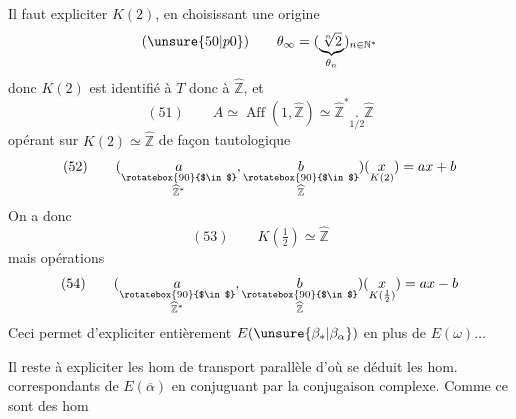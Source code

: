 Il faut expliciter $K(2)$,  en choisissant une origine
\[
(\unsure{50|p0})\qquad\theta_\infty=
(\underbrace{\sqrt[n]{2}}_{\theta_n})_{n\in\mathbb N^*}
\]
donc $K(2)$ est identifié à $T$ donc à $\widehat{\mathbb Z}$, et
\[
(51)\qquad A\simeq\operatorname{Aff}(1,\widehat{\mathbb Z})
\simeq\widehat{\mathbb Z}^{*}\mathbin{\underset{\scriptscriptstyle1/2}{.}}\widehat{\mathbb Z}
\]
opérant sur $K(2)\simeq\widehat{\mathbb Z}$ de façon tautologique
\[
(52)\qquad
(\underset{\substack{\rotatebox{90}{$\in$}\\\widehat{\mathbb Z}^{*}}}{a},
\underset{\substack{\rotatebox{90}{$\in$}\\\widehat{\mathbb Z}}}{b})
(\underset{K(2)}x)=ax+b
\]
On a donc
\[
(53)\qquad K(\tfrac12)\simeq\widehat{\mathbb Z}
\]
mais opérations
\[
(54)\qquad
(\underset{\substack{\rotatebox{90}{$\in$}\\\widehat{\mathbb Z}^{*}}}{a},
\underset{\substack{\rotatebox{90}{$\in$}\\\widehat{\mathbb Z}}}{b})
(\underset{K(\frac12)}x)=ax-b
\]
Ceci permet d'expliciter entièrement $E(\unsure{\beta_*|\beta_\alpha})$
en plus de $E(\omega)\ldots$

Il reste  à expliciter les hom de transport parallèle
\diagram{\[
\begin{tikzcd}[ampersand replacement=\&,row sep=small,column sep=large]
\&E_0\&\&\&E'_0=E_2\\
E(\alpha)\arrow[ur]\arrow[r]\arrow[dr]\&E_1\&\text{et}\&
E(\alpha)\arrow[ur,"\sim"]\arrow[r,"\sim"]\arrow[dr,"\sim"']\&E'_1=E_{-1}\\
\&E_\infty\&\&\&E'_\infty\simeq E_{1/2}
\end{tikzcd}
\]}
d'où se déduit les hom. correspondants de $E(\overline\alpha)$
en conjuguant par la conjugaison complexe. Comme ce sont des hom

